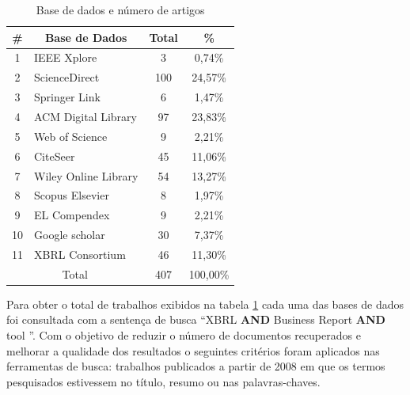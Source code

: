 \documentclass[12pt]{article}
\begin{document}
\begin{table}[ht]
\centering
\begin{tabular}{|c|l|c|c|}
\hline
\textbf{\#} & \multicolumn{1}{c|}{\textbf{Base de Dados}} & \textbf{Total} & \textbf{\%} \\ \hline
1           & IEEE Xplore                                 & 3              & 0,74\%      \\ \hline
2           & ScienceDirect                               & 100            & 24,57\%     \\ \hline
3           & Springer Link                               & 6              & 1,47\%      \\ \hline
4           & ACM Digital Library                         & 97             & 23,83\%     \\ \hline
5           & Web of Science                              & 9              & 2,21\%      \\ \hline
6           & CiteSeer                                    & 45             & 11,06\%     \\ \hline
7           & Wiley Online Library                        & 54             & 13,27\%     \\ \hline
8           & Scopus Elsevier                             & 8              & 1,97\%      \\ \hline
9           & EL Compendex                                & 9              & 2,21\%      \\ \hline
10          & Google scholar                              & 30             & 7,37\%      \\ \hline
11          & XBRL Consortium                             & 46             & 11,30\%     \\ \hline
\multicolumn{2}{|c|}{Total}                               & 407            & 100,00\%    \\ \hline
\end{tabular}
\caption{Base de dados e número de artigos}
\label{tab:base-dados}
\end{table}

Para obter o total de trabalhos exibidos na tabela \ref{tab:base-dados} cada
uma das bases de dados foi consultada com a sentença de busca ``XBRL \textbf{AND} Business Report \textbf{AND} tool
''. Com o objetivo de reduzir o número de documentos recuperados e melhorar a
qualidade dos resultados o seguintes critérios foram aplicados nas ferramentas
de busca: trabalhos publicados a partir de 2008 em que os termos pesquisados
estivessem no título, resumo ou nas palavras-chaves.
\end{document}
